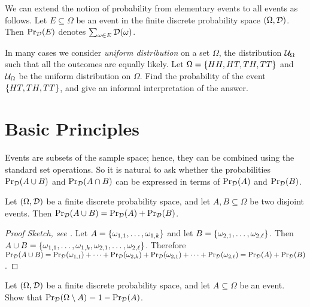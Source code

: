 We can extend the notion of probability from elementary events to all events as
follows. Let $E \subseteq \Omega$ be an event in the finite discrete probability
space $(\Omega, \mathcal{D})$. Then $\Pr_{\mathcal{D}}(E)$ denotes
$\sum_{\omega \in E} \mathcal{D}(\omega)$. 

\begin{exercise}
  In many cases we consider \emph{uniform distribution} on a set $\Omega$, the
  distribution $\mathcal{U}_{\Omega}$ such that all the outcomes are equally
  likely.
  Let $\Omega = \set{HH, HT, TH, TT}$ and $\mathcal{U}_{\Omega}$ be the
  uniform distribution on $\Omega$. Find the probability of the event 
  $\set{HT, TH, TT}$, and give an informal interpretation of the answer.
\end{exercise}

\section{Basic Principles}

Events are subsets of the sample space; hence, they can be combined using the
standard set operations. So it is natural to ask whether the probabilities
$\Pr_{\mathcal{D}}(A \cup B)$ and $\Pr_{\mathcal{D}}(A \cap B)$ can be
expressed in terms of $\Pr_{\mathcal{D}}(A)$ and $\Pr_{\mathcal{D}}(B)$.

\begin{theorem}
  Let $(\Omega, \mathcal{D})$ be a finite discrete probability space, and let $A, B
  \subseteq \Omega$ be two disjoint events. Then 
  $\Pr_{\mathcal{D}}(A \cup B) = \Pr_{\mathcal{D}}(A) +
  \Pr_{\mathcal{D}}(B)$.
\end{theorem}
\begin{proof}[Proof Sketch, see ]
  Let $A = \set{\omega_{1, 1}, \dots, \omega_{1, k}}$ and 
  let $B = \set{\omega_{2, 1}, \dots, \omega_{2, \ell}}$. 
  Then $A \cup B = \set{\omega_{1, 1}, \dots, \omega_{1, k}, 
    \omega_{2, 1}, \dots, \omega_{2, \ell}}$.
  Therefore $\Pr_{\mathcal{D}}(A \cup B) = 
    \Pr_{\mathcal{D}}(\omega_{1, 1}) + \dots +
    \Pr_{\mathcal{D}}(\omega_{2, k}) +
    \Pr_{\mathcal{D}}(\omega_{2, 1}) + \dots +
    \Pr_{\mathcal{D}}(\omega_{2, \ell}) = 
    \Pr_{\mathcal{D}}(A) +
    \Pr_{\mathcal{D}}(B)$.
\end{proof}

\begin{exercise}
  Let $(\Omega, \mathcal{D})$ be a finite discrete probability space, and let $A
  \subseteq \Omega$ be an event. Show that 
  $\Pr_{\mathcal{D}}(\Omega \setminus A) = 1 - \Pr_{\mathcal{D}}(A)$.
\end{exercise}

